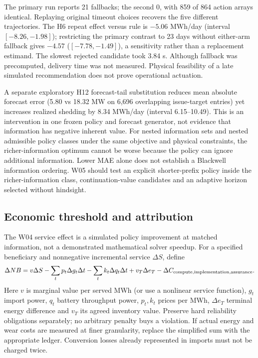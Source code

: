 \documentclass[11pt,letterpaper]{article}
\begin{document}
The primary run reports 21 fallbacks; the second 0, with 859 of 864 action arrays identical. Replaying original timeout choices recovers the five different trajectories. The H6 repeat effect versus rule is $-5.06$ MWh/day (interval $[-8.26,-1.98]$); restricting the primary contrast to 23 days without either-arm fallback gives $-4.57$ ($[-7.78,-1.49]$), a sensitivity rather than a replacement estimand. The slowest rejected candidate took 3.84 s. Although fallback was precomputed, delivery time was not measured. Physical feasibility of a late simulated recommendation does not prove operational actuation.

A separate exploratory H12 forecast-tail substitution reduces mean absolute forecast error (5.80 vs 18.32 MW on 6,696 overlapping issue-target entries) yet increases realized shedding by 8.34 MWh/day (interval 6.15--10.49). This is an intervention in one frozen policy and forecast generator, not evidence that information has negative inherent value. For nested information sets and nested admissible policy classes under the same objective and physical constraints, the richer-information optimum cannot be worse because the policy can ignore additional information. Lower MAE alone does not establish a Blackwell information ordering. W05 should test an explicit shorter-prefix policy inside the richer-information class, continuation-value candidates and an adaptive horizon selected without hindsight.

\subsection{Economic threshold and attribution}
\label{sec:w04econ}
The W04 service effect is a simulated policy improvement at matched information, not a demonstrated mathematical solver speedup. For a specified beneficiary and nonnegative incremental service $\Delta S$, define
\[
 \Delta NB=v\Delta S-\sum_t p_t\Delta g_t\Delta t
     -\sum_t k_t\Delta q_t\Delta t+v_T\Delta e_T
     -\Delta C_{\rm compute,implementation,assurance}.
\]
Here $v$ is marginal value per served MWh (or use a nonlinear service function), $g_t$ import power, $q_t$ battery throughput power, $p_t,k_t$ prices per MWh, $\Delta e_T$ terminal energy difference and $v_T$ its agreed inventory value. Preserve hard reliability obligations separately; no arbitrary penalty buys a violation. If actual energy and wear costs are measured at finer granularity, replace the simplified sum with the appropriate ledger. Conversion losses already represented in imports must not be charged twice.
\end{document}
